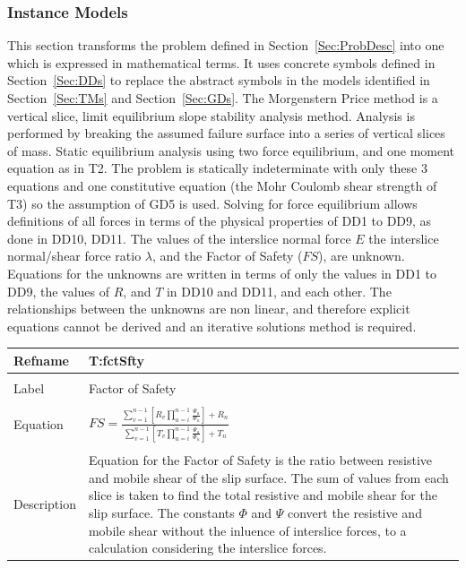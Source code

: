 \documentclass[12pt]{article}
\begin{document}
\subsubsection{Instance Models}
\label{Sec:IMs}
This section transforms the problem defined in Section~\ref{Sec:ProbDesc} into one which is expressed in mathematical terms. It uses concrete symbols defined in Section~\ref{Sec:DDs} to replace the abstract symbols in the models identified in Section~\ref{Sec:TMs} and Section~\ref{Sec:GDs}.
The Morgenstern Price method is a vertical slice, limit equilibrium slope stability analysis method. Analysis is performed by breaking the assumed failure surface into a series of vertical slices of mass. Static equilibrium analysis using two force equilibrium, and one moment equation as in T2. The problem is statically indeterminate with only these 3 equations and one constitutive equation (the Mohr Coulomb shear strength of T3) so the assumption of GD5 is used. Solving for force equilibrium allows definitions of all forces in terms of the physical properties of DD1 to DD9, as done in DD10, DD11.
The values of the interslice normal force $E$ the interslice normal/shear force ratio $\lambda{}$, and the Factor of Safety ($FS$), are unknown. Equations for the unknowns are written in terms of only the values in DD1 to DD9, the values of $R$, and $T$ in DD10 and DD11, and each other. The relationships between the unknowns are non linear, and therefore explicit equations cannot be derived and an iterative solutions method is required.
~\newline
\noindent \begin{minipage}{\textwidth}
\begin{tabular}{p{} p{}}
\toprule \textbf{Refname} & \textbf{T:fctSfty}
\label{T:fctSfty}
\\ \midrule \\
Label & Factor of Safety
\\ \midrule \\
Equation & $FS=\frac{\displaystyle\sum_{v=1}^{n-1}{\left[R_{v} \displaystyle\prod_{u=i}^{n-1}{\frac{\Psi{}_{u}}{\Phi{}_{u}}}\right]}+R_{n}}{\displaystyle\sum_{v=1}^{n-1}{\left[T_{v} \displaystyle\prod_{u=i}^{n-1}{\frac{\Psi{}_{u}}{\Phi{}_{u}}}\right]}+T_{n}}$
\\ \midrule \\
Description & Equation for the Factor of Safety is the ratio between resistive and mobile shear of the slip surface. The sum of values from each slice is taken to find the total resistive and mobile shear for the slip surface. The constants $\Phi{}$ and $\Psi{}$ convert the resistive and mobile shear without the inluence of interslice forces, to a calculation considering the interslice forces.
\\ \bottomrule \end{tabular}
\end{minipage}\\
\end{document}

